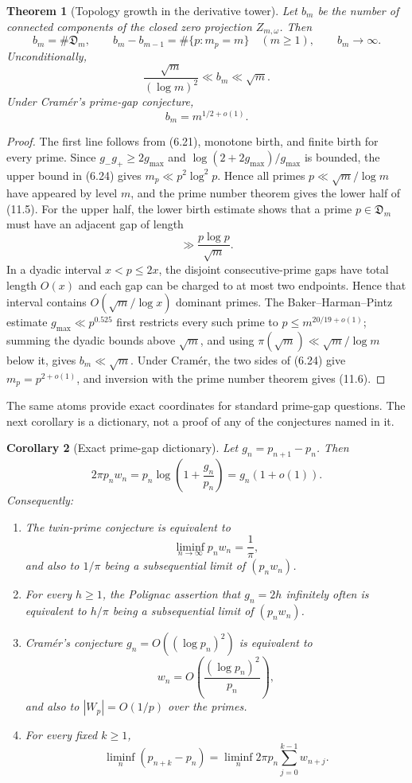 \documentclass[11pt]{article}
\newtheorem{theorem}{Theorem}[section]
\newtheorem{corollary}[theorem]{Corollary}
\theoremstyle{definition}
\theoremstyle{remark}
\begin{document}
\begin{theorem}[Topology growth in the derivative tower]
\label{thm:component-growth}
Let $b_m$ be the number of connected components of the closed zero projection
$Z_{m,\omega}$.  Then
\[
 b_m=\#\mathfrak D_m,\qquad
 b_m-b_{m-1}=\#\{p:m_p=m\}\quad(m\ge1),\qquad
 b_m\longrightarrow\infty.
\tag{11.4}
\]
Unconditionally,
\[
 \boxed{
 \frac{\sqrt m}{(\log m)^2}\ll b_m
 \ll\sqrt m.}
\tag{11.5}
\]
Under Cram\'er's prime-gap conjecture,
\[
 \boxed{b_m=m^{1/2+o(1)}.}
\tag{11.6}
\]
\end{theorem}

\begin{proof}
The first line follows from (6.21), monotone birth, and finite birth for every
prime.  Since $g_-g_+\ge2g_{\max}$ and
$\log(2+2g_{\max})/g_{\max}$ is bounded, the upper bound in (6.24) gives
$m_p\ll p^2\log^2p$.  Hence all primes
$p\ll\sqrt m/\log m$ have appeared by level $m$, and the prime number theorem
gives the lower half of (11.5).  For the upper half, the lower birth estimate
shows that a prime $p\in\mathfrak D_m$ must have an adjacent gap of length
\[
 \gg \frac{p\log p}{\sqrt m}.
\]
In a dyadic interval $x<p\le2x$, the disjoint consecutive-prime gaps have total
length $O(x)$ and each gap can be charged to at most two endpoints.  Hence that
interval contains $O(\sqrt m/\log x)$ dominant primes.  The
Baker--Harman--Pintz estimate $g_{\max}\ll p^{0.525}$
\cite{BakerHarmanPintz2001} first restricts every such prime to
$p\le m^{20/19+o(1)}$; summing the dyadic bounds above $\sqrt m$, and using
$\pi(\sqrt m)\ll\sqrt m/\log m$ below it, gives $b_m\ll\sqrt m$.
Under Cram\'er, the two sides of (6.24) give
$m_p=p^{2+o(1)}$, and inversion with the prime number theorem gives (11.6).
\end{proof}

The same atoms provide exact coordinates for standard prime-gap questions.  The
next corollary is a dictionary, not a proof of any of the conjectures named in it.

\begin{corollary}[Exact prime-gap dictionary]
\label{cor:gap-dictionary}
Let $g_n=p_{n+1}-p_n$.  Then
\[
 2\pi p_nw_n=p_n\log\left(1+\frac{g_n}{p_n}\right)
 =g_n(1+o(1)).
\tag{11.7}
\]
Consequently:
\begin{enumerate}[label=\textup{(\roman*)},leftmargin=2.2em]
\item The twin-prime conjecture is equivalent to
\[
 \liminf_{n\to\infty}p_nw_n=\frac1\pi,
\]
and also to $1/\pi$ being a subsequential limit of $(p_nw_n)$.
\item For every $h\ge1$, the Polignac assertion that $g_n=2h$ infinitely often
is equivalent to $h/\pi$ being a subsequential limit of $(p_nw_n)$.
\item Cram\'er's conjecture $g_n=O((\log p_n)^2)$ is equivalent to
\[
 w_n=O\left(\frac{(\log p_n)^2}{p_n}\right),
\tag{11.8}
\]
and also to $|W_p|=O(1/p)$ over the primes.
\item For every fixed $k\ge1$,
\[
 \liminf_n(p_{n+k}-p_n)
 =\liminf_n2\pi p_n\sum_{j=0}^{k-1}w_{n+j}.
\tag{11.9}
\]
\end{enumerate}
\end{corollary}
\end{document}
